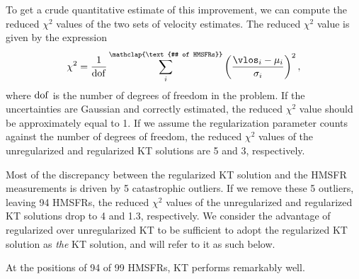 To get a crude quantitative estimate of this improvement, we can compute the reduced $\chi^2$ values of the two sets of velocity estimates. 
The reduced $\chi^2$ value is given by the expression
\begin{equation}
\chi^2 = \frac{1}{\rm{dof}} \sum_i^\mathclap{\text{# of HMSFRs}} \left(\frac{\vlos_i - \mu_i}{\sigma_i} \right)^2, 
\end{equation}
where $\rm{dof}$ is the number of degrees of freedom in the problem.
If the uncertainties are Gaussian and correctly estimated, the reduced $\chi^2$ value should be approximately equal to 1.
If we assume the regularization parameter counts against the number of degrees of freedom, the reduced $\chi^2$ values of the unregularized and regularized KT solutions are 5 and 3, respectively.

Most of the discrepancy between the regularized KT solution and the HMSFR measurements is driven by 5 catastrophic outliers. 
If we remove these 5 outliers, leaving 94 HMSFRs, the reduced $\chi^2$ values of the unregularized and regularized KT solutions drop to 4 and 1.3, respectively. 
We consider the advantage of regularized over unregularized KT to be sufficient to adopt the regularized KT solution as \emph{the} KT solution, and will refer to it as such below.

At the positions of 94 of 99 HMSFRs, KT performs remarkably well. 
